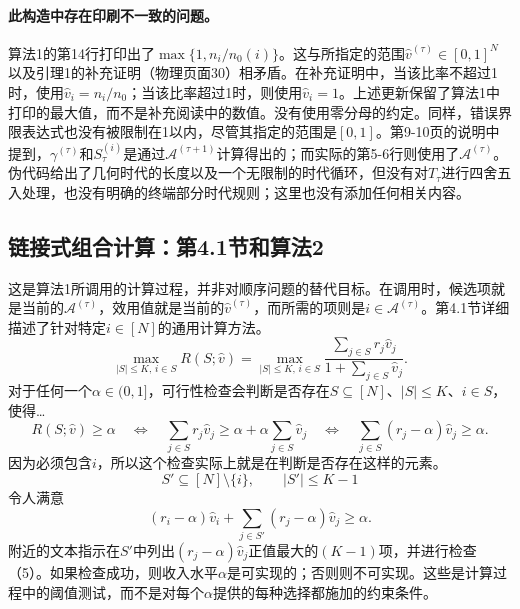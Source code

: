 \documentclass{article}
\begin{document}
\paragraph{此构造中存在印刷不一致的问题。}
算法1的第14行打印出了$\max\{1,n_i/n_0(i)\}$。这与所指定的范围$\widehat v^{(\tau)}\in[0,1]^N$以及引理1的补充证明（物理页面30）相矛盾。在补充证明中，当该比率不超过1时，使用$\widehat v_i=n_i/n_0$；当该比率超过1时，则使用$\widehat v_i=1$。上述更新保留了算法1中打印的最大值，而不是补充阅读中的数值。没有使用零分母的约定。同样，错误界限表达式也没有被限制在1以内，尽管其指定的范围是$[0,1]$。第9-10页的说明中提到，$\gamma^{(\tau)}$和$S_\tau^{(i)}$是通过$\mathcal A^{(\tau+1)}$计算得出的；而实际的第5-6行则使用了$\mathcal A^{(\tau)}$。伪代码给出了几何时代的长度以及一个无限制的时代循环，但没有对$T_\tau$进行四舍五入处理，也没有明确的终端部分时代规则；这里也没有添加任何相关内容。

\subsection*{链接式组合计算：第4.1节和算法2}
这是算法1所调用的计算过程，并非对顺序问题的替代目标。在调用时，候选项就是当前的$\mathcal A^{(\tau)}$，效用值就是当前的$\widehat v^{(\tau)}$，而所需的项则是$i\in\mathcal A^{(\tau)}$。第4.1节详细描述了针对特定$i\in[N]$的通用计算方法。
\begin{equation}
\max_{|S|\le K,\,i\in S}R(S;\widehat v)
=\max_{|S|\le K,\,i\in S}
\frac{\sum_{j\in S}r_j\widehat v_j}{1+\sum_{j\in S}\widehat v_j}.
\tag{4}
\end{equation}
对于任何一个$\alpha\in(0,1]$，可行性检查会判断是否存在$S\subseteq[N]$、$|S|\le K$、$i\in S$，使得…
\[
R(S;\widehat v)\ge\alpha
\quad\Longleftrightarrow\quad
\sum_{j\in S}r_j\widehat v_j
\ge\alpha+\alpha\sum_{j\in S}\widehat v_j
\quad\Longleftrightarrow\quad
\sum_{j\in S}(r_j-\alpha)\widehat v_j\ge\alpha.
\]
因为必须包含$i$，所以这个检查实际上就是在判断是否存在这样的元素。
\[
S'\subseteq[N]\setminus\{i\},\qquad |S'|\le K-1
\]
令人满意
\begin{equation}
(r_i-\alpha)\widehat v_i
+\sum_{j\in S'}(r_j-\alpha)\widehat v_j\ge\alpha.
\tag{5}
\end{equation}
附近的文本指示在$S'$中列出$(r_j-\alpha)\widehat v_j$正值最大的$(K-1)$项，并进行检查（5）。如果检查成功，则收入水平$\alpha$是可实现的；否则则不可实现。这些是计算过程中的阈值测试，而不是对每个$\alpha$提供的每种选择都施加的约束条件。
\end{document}

